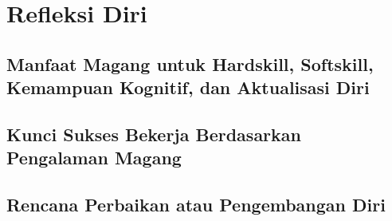 \chapter{Refleksi Diri}

\section{Manfaat Magang untuk Hardskill, Softskill, Kemampuan Kognitif, dan Aktualisasi Diri}

\section{Kunci Sukses Bekerja Berdasarkan Pengalaman Magang}

\section{Rencana Perbaikan atau Pengembangan Diri}
